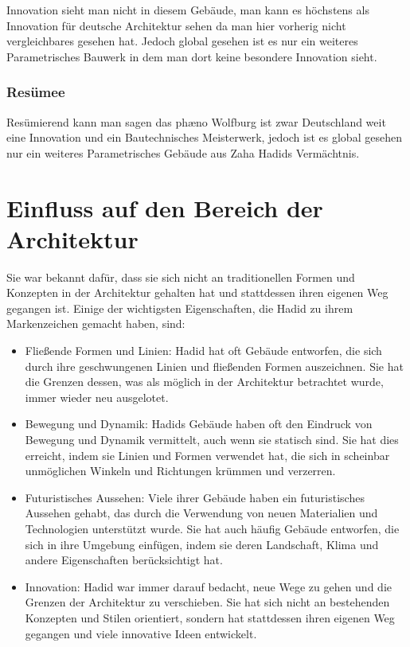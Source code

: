 \documentclass[a4paper]{article}
\begin{document}
Innovation sieht man nicht in diesem Gebäude, man kann es höchstens als
Innovation für deutsche Architektur sehen da man hier vorherig nicht
vergleichbares gesehen hat. Jedoch global gesehen ist es nur ein weiteres
Parametrisches Bauwerk in dem man dort keine besondere Innovation sieht.

\subsubsection{Resümee}
Resümierend kann man sagen das phæno Wolfburg ist zwar Deutschland weit eine
Innovation und ein Bautechnisches Meisterwerk, jedoch ist es global gesehen nur
ein weiteres Parametrisches Gebäude aus Zaha Hadids Vermächtnis. 

\section{Einfluss auf den Bereich der Architektur}

Sie war bekannt dafür, dass sie sich nicht an traditionellen Formen und
Konzepten in der Architektur gehalten hat und stattdessen ihren eigenen Weg
gegangen ist. Einige der wichtigsten Eigenschaften, die Hadid zu ihrem
Markenzeichen gemacht haben, sind:

\begin{itemize}
\item Fließende Formen und Linien: Hadid hat oft Gebäude entworfen, die sich
	durch ihre geschwungenen Linien und fließenden Formen auszeichnen. Sie hat die
	Grenzen dessen, was als möglich in der Architektur betrachtet wurde, immer
	wieder neu ausgelotet.
\item Bewegung und Dynamik: Hadids Gebäude haben oft den Eindruck von Bewegung
	und Dynamik vermittelt, auch wenn sie statisch sind. Sie hat dies erreicht,
	indem sie Linien und Formen verwendet hat, die sich in scheinbar unmöglichen
	Winkeln und Richtungen krümmen und verzerren.
\item Futuristisches Aussehen: Viele ihrer Gebäude haben ein futuristisches
	Aussehen gehabt, das durch die Verwendung von neuen Materialien und
	Technologien unterstützt wurde. Sie hat auch häufig Gebäude entworfen, die
	sich in ihre Umgebung einfügen, indem sie deren Landschaft, Klima und andere
	Eigenschaften berücksichtigt hat.
\item Innovation: Hadid war immer darauf bedacht, neue Wege zu gehen und die
	Grenzen der Architektur zu verschieben. Sie hat sich nicht an bestehenden
	Konzepten und Stilen orientiert, sondern hat stattdessen ihren eigenen Weg
	gegangen und viele innovative Ideen entwickelt.
\end{itemize}
\end{document}
